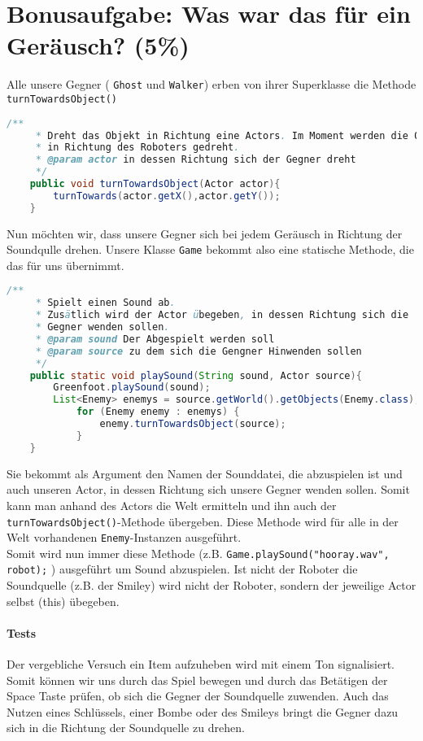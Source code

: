 \documentclass{pi1}
\begin{document}
\section{Bonusaufgabe: Was war das für ein Geräusch? (5\%)}

Alle unsere Gegner ( \texttt{Ghost} und  \texttt{Walker}) erben von ihrer Superklasse die Methode \texttt{turnTowardsObject()}

\begin{lstlisting}[caption={Methode \emph{turnTowardsObject()}}, firstnumber=31, language=Java]
/**
     * Dreht das Objekt in Richtung eine Actors. Im Moment werden die Objekte
     * in Richtung des Roboters gedreht.
     * @param actor in dessen Richtung sich der Gegner dreht
     */
    public void turnTowardsObject(Actor actor){
        turnTowards(actor.getX(),actor.getY());
    }
\end{lstlisting}

Nun möchten wir, dass unsere Gegner sich bei jedem Geräusch in Richtung der Soundqulle drehen. Unsere Klasse \texttt{Game} bekommt also eine statische Methode, die das für uns übernimmt.

\begin{lstlisting}[caption={Methode \emph{playSound()} in der Klasse Game}, firstnumber=43, language=Java]
/**
     * Spielt einen Sound ab. 
     * Zusätlich wird der Actor übegeben, in dessen Richtung sich die
     * Gegner wenden sollen.
     * @param sound Der Abgespielt werden soll
     * @param source zu dem sich die Gengner Hinwenden sollen
     */
    public static void playSound(String sound, Actor source){
        Greenfoot.playSound(sound);
        List<Enemy> enemys = source.getWorld().getObjects(Enemy.class);
            for (Enemy enemy : enemys) {
                enemy.turnTowardsObject(source);
            }
    }
\end{lstlisting}

Sie bekommt als Argument den Namen der Sounddatei, die abzuspielen ist und auch unseren Actor, in dessen Richtung sich unsere Gegner wenden sollen. Somit kann man anhand des Actors die Welt ermitteln und ihn auch der  \texttt{turnTowardsObject()}-Methode übergeben. Diese Methode wird für alle in der Welt vorhandenen  \texttt{Enemy}-Instanzen ausgeführt.\\
Somit wird nun immer diese Methode (z.B. \texttt{Game.playSound("hooray.wav", robot);} ) ausgeführt um Sound abzuspielen. Ist nicht der Roboter die Soundquelle (z.B. der Smiley) wird nicht der Roboter, sondern der jeweilige Actor selbst (this) übegeben.

\paragraph{Tests} Der vergebliche Versuch ein Item aufzuheben wird mit einem Ton signalisiert. Somit können wir uns durch das Spiel bewegen und durch das Betätigen der Space Taste prüfen, ob sich die Gegner der Soundquelle zuwenden.
Auch das Nutzen eines Schlüssels, einer Bombe oder des Smileys bringt die Gegner dazu sich in die Richtung der Soundquelle zu drehen.
\end{document}
